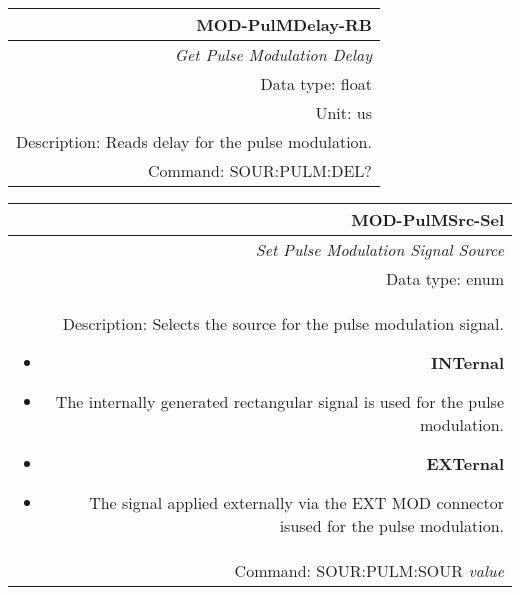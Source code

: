 \documentclass[openany]{article}
\begin{document}
		\begin{tabular}{N}
			\hline
			\bfseries MOD-PulMDelay-RB \\ \hline
			\emph{Get Pulse Modulation Delay} \\
			Data type: float \\
			Unit: us \\
			Description: Reads delay for the pulse modulation. \\
			Command: SOUR:PULM:DEL? \\

		\end{tabular}
%
		\begin{tabular}{N}
			\hline
			\bfseries MOD-PulMSrc-Sel \\ \hline
			\emph{Set Pulse Modulation Signal Source} \\
			Data type: enum \\  
			Description: Selects the source for the pulse modulation signal.\begin{itemize}[noitemsep]
				\small
				\item[] \textbf{INTernal}
                                \item[] The internally generated rectangular signal is used for the pulse modulation.
                                \item[] \textbf{EXTernal}
                                \item[] The signal applied externally via the EXT MOD connector isused for the pulse modulation.
			\end{itemize} \\
			Command: SOUR:PULM:SOUR \emph{value} \\

		\end{tabular}
\end{document}
